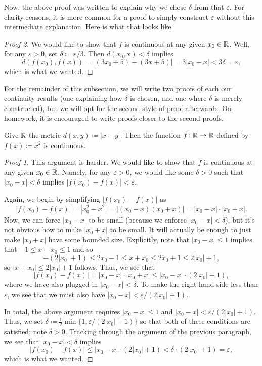 \documentclass[../main.tex]{subfiles}
\begin{document}
Now, the above proof was written to explain why we chose $\delta$ from that $\varepsilon$. For clarity reasons, it is more common for a proof to simply construct $\varepsilon$ without this intermediate explanation. Here is what that looks like.
\begin{proof}[Proof 2]
    We would like to show that $f$ is continuous at any given $x_0\in\mathbb R$. Well, for any $\varepsilon>0$, set $\delta\coloneqq\varepsilon/3$. Then $d(x_0,x)<\delta$ implies
    \[d(f(x_0),f(x))=|(3x_0+5)-(3x+5)|=3|x_0-x|<3\delta=\varepsilon,\]
    which is what we wanted.
\end{proof}
For the remainder of this subsection, we will write two proofs of each our continuity results (one explaining how $\delta$ is chosen, and one where $\delta$ is merely constructed), but we will opt for the second style of proof afterwards. On homework, it is encouraged to write proofs closer to the second proofs.
\begin{example}
    Give $\mathbb R$ the metric $d(x,y)\coloneqq|x-y|$. Then the function $f\colon\mathbb R\to\mathbb R$ defined by $f(x)\coloneqq x^2$ is continuous.
\end{example}
\begin{proof}[Proof 1]
    This argument is harder. We would like to show that $f$ is continuous at any given $x_0\in\mathbb R$. Namely, for any $\varepsilon>0$, we would like some $\delta>0$ such that $|x_0-x|<\delta$ implies $|f(x_0)-f(x)|<\varepsilon$.

    Again, we begin by simplifying $|f(x_0)-f(x)|$ as
    \[|f(x_0)-f(x)|=\left|x_0^2-x^2\right|=|(x_0-x)(x_0+x)|=|x_0-x|\cdot|x_0+x|.\]
    Now, we can force $|x_0-x|$ to be small (because we enforce $|x_0-x|<\delta$), but it's not obvious how to make $|x_0+x|$ to be small. It will actually be enough to just make $|x_0+x|$ have some bounded size. Explicitly, note that $|x_0-x|\le1$ implies that $-1\le x-x_0\le1$ and so
    \[-(2|x_0|+1)\le2x_0-1\le x+x_0\le2x_0+1\le2|x_0|+1,\]
    so $|x+x_0|\le2|x_0|+1$ follows. Thus, we see that
    \[|f(x_0)-f(x)|=|x_0-x|\cdot|x_0+x|\le|x_0-x|\cdot(2|x_0|+1),\]
    where we have also plugged in $|x_0-x|<\delta$. To make the right-hand side less than $\varepsilon$, we see that we must also have $|x_0-x|<\varepsilon/(2|x_0|+1)$.

    In total, the above argument requires $|x_0-x|\le1$ and $|x_0-x|<\varepsilon/(2|x_0|+1)$. Thus, we set $\delta\coloneqq\frac12\min\{1,\varepsilon/(2|x_0|+1)\}$ so that both of these conditions are satisfied; note $\delta>0$. Tracking through the argument of the previous paragraph, we see that $|x_0-x|<\delta$ implies
    \[|f(x_0)-f(x)|\le|x_0-x|\cdot(2|x_0|+1)<\delta\cdot(2|x_0|+1)=\varepsilon,\]
    which is what we wanted.
\end{proof}
\end{document}
